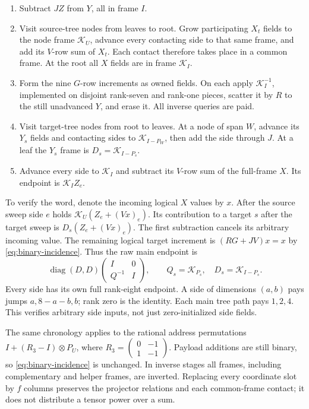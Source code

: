 \begin{enumerate}
\item Subtract $JZ$ from $Y$, all in frame $I$.
\item Visit source-tree nodes from leaves to root. Grow participating
$X_t$ fields to the node frame $\mathcal K_U$, advance every contacting
side to that same frame, and add its $V$-row sum of $X_t$. Each contact
therefore takes place in a common frame. At the root all $X$ fields
are in frame $\mathcal K_I$.
\item Form the nine $G$-row increments as owned fields. On each apply
$\mathcal K_I^{-1}$, implemented on disjoint rank-seven and rank-one
pieces, scatter it by $R$ to the still unadvanced $Y$, and erase it.
All inverse queries are paid.
\item Visit target-tree nodes from root to leaves. At a node of span
$W$, advance its $Y_s$ fields and contacting sides to
$\mathcal K_{I-P_W}$, then add the side through $J$. At a leaf the
$Y_s$ frame is $D_s=\mathcal K_{I-P_s}$.
\item Advance every side to $\mathcal K_I$ and subtract its $V$-row
sum of the full-frame $X$. Its endpoint is $\mathcal K_I Z_e$.
\end{enumerate}

To verify the word, denote the incoming logical $X$ values by $x$.
After the source sweep side $e$ holds
$\mathcal K_U(Z_e+(Vx)_e)$. Its contribution to a target $s$ after
the target sweep is $D_s(Z_e+(Vx)_e)$. The first subtraction cancels
its arbitrary incoming value. The remaining logical target increment
is $(RG+JV)x=x$ by \eqref{eq:binary-incidence}. Thus the raw main
endpoint is
\[
 \operatorname{diag}(D,D)
 \begin{pmatrix}I&0\\Q^{-1}&I\end{pmatrix},
 \qquad Q_s=\mathcal K_{P_s},\quad D_s=\mathcal K_{I-P_s}.
\]
Every side has its own full rank-eight endpoint. A side of dimensions
$(a,b)$ pays jumps $a,8-a-b,b$; rank zero is the identity. Each main
tree path pays $1,2,4$. This verifies arbitrary side inputs, not just
zero-initialized side fields.

The same chronology applies to the rational address permutations
$I+(R_3-I)\otimes P_U$, where
$R_3=\left(\begin{smallmatrix}0&-1\\1&-1\end{smallmatrix}\right)$.
Payload additions are still binary, so \eqref{eq:binary-incidence}
is unchanged. In inverse stages all frames, including complementary
and helper frames, are inverted. Replacing every coordinate slot by
$f$ columns preserves the projector relations and each common-frame
contact; it does not distribute a tensor power over a sum.

